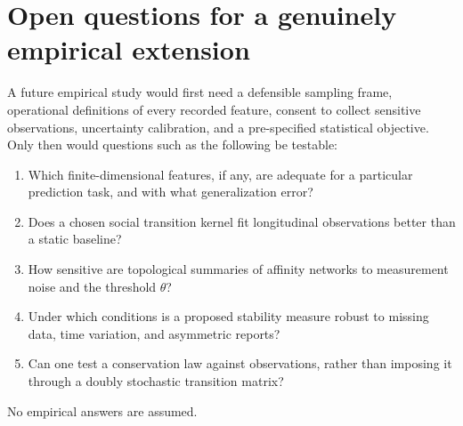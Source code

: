 \documentclass[11pt,a4paper]{article}
\numberwithin{equation}{section}
\theoremstyle{remark}
\newcommand{\1}{\mathbf{1}}
\begin{document}
\section{Open questions for a genuinely empirical extension}
A future empirical study would first need a defensible sampling frame,
operational definitions of every recorded feature, consent to collect
sensitive observations, uncertainty calibration, and a pre-specified
statistical objective.  Only then would questions such as the
following be testable:
\begin{enumerate}
\item Which finite-dimensional features, if any, are adequate for a
      particular prediction task, and with what generalization error?
\item Does a chosen social transition kernel fit longitudinal
      observations better than a static baseline?
\item How sensitive are topological summaries of affinity networks
      to measurement noise and the threshold $\theta$?
\item Under which conditions is a proposed stability measure
      robust to missing data, time variation, and asymmetric reports?
\item Can one test a conservation law against observations, rather
      than imposing it through a doubly stochastic transition matrix?
\end{enumerate}
No empirical answers are assumed.
\end{document}
